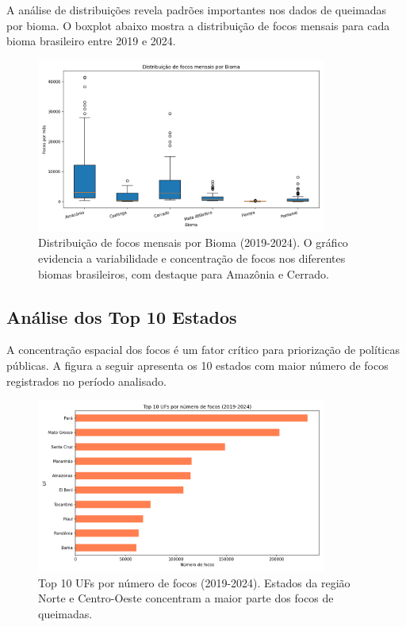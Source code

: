 \documentclass[12pt,a4paper]{report}
\begin{document}
A análise de distribuições revela padrões importantes nos dados de queimadas por bioma. O boxplot abaixo mostra a distribuição de focos mensais para cada bioma brasileiro entre 2019 e 2024.

\begin{figure}[h]
\centering
\includegraphics[width=0.85\textwidth]{../figs/eda/boxplot_bioma.png}
\caption{Distribuição de focos mensais por Bioma (2019-2024). O gráfico evidencia a variabilidade e concentração de focos nos diferentes biomas brasileiros, com destaque para Amazônia e Cerrado.}
\label{fig:boxplot_bioma}
\end{figure}

\subsection{Análise dos Top 10 Estados}

A concentração espacial dos focos é um fator crítico para priorização de políticas públicas. A figura a seguir apresenta os 10 estados com maior número de focos registrados no período analisado.

\begin{figure}[h]
\centering
\includegraphics[width=0.85\textwidth]{../figs/eda/top10_uf.png}
\caption{Top 10 UFs por número de focos (2019-2024). Estados da região Norte e Centro-Oeste concentram a maior parte dos focos de queimadas.}
\label{fig:top10_uf}
\end{figure}
\end{document}
